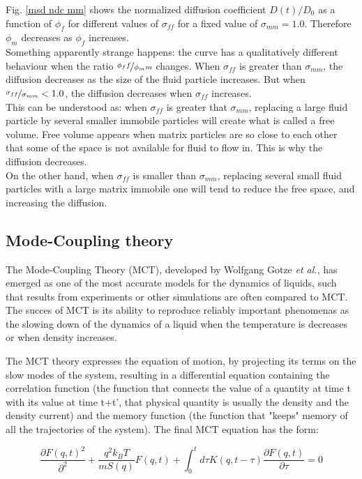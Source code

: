 \documentclass[a4paper,12pt]{article}
\newcommand{\jline}{\vspace{10pt}}
\newcommand{\etal}{\textit{et al.}}
\begin{document}
Fig. \ref{msd ndc mm} shows the normalized diffusion coefficient $D(t)/D_0$ as a function of $\phi_f$ for different values of $\sigma_{ff}$ for a fixed value of $\sigma_{mm}=1.0$. Therefore $\phi_m$ decreases as $\phi_f$ increases.\\
Something apparently strange happens: the curve has a qualitatively different behaviour when the ratio $\nicefrac{\phi_ff}{\phi_mm}$ changes. When $\sigma_{ff}$ is greater than $\sigma_{mm}$, the diffusion decreases as the size of the fluid particle increases. But when $\nicefrac{\sigma_{ff}}{\sigma_{mm}}<1.0$, the diffusion decreases when $\sigma_{ff}$ increases.\\
This can be understood as: when $\sigma_{ff}$ is greater that $\sigma_{mm}$, replacing a large fluid particle by several smaller immobile particles will create what is called a free volume. Free volume appears when matrix particles are so close to each other that some of the space is not available for fluid to flow in. This is why the diffusion decreases. \\
On the other hand, when $\sigma_{ff}$ is smaller than $\sigma_{mm}$, replacing several small fluid particles with a large matrix immobile one will tend to reduce the free space, and increasing the diffusion.

\subsection{Mode-Coupling theory}
\label{mct}

The Mode-Coupling Theory (MCT), developed by Wolfgang Gotze \etal \cite{Bengtzelius1984}, has emerged as one of the most accurate models for the dynamics of liquids, such that results from experiments or other simulations are often compared to MCT. The succes of MCT is its ability to reproduce reliably important phenomenas as the slowing down of the dynamics of a liquid when the temperature is decreases or when density increases.\jline

The MCT theory expresses the equation of motion, by projecting its terms on the slow modes of the system, resulting in a differential equation containing the correlation function (the function that connects the value of a quantity at time t with its value at time t+t', that physical quantity is usually the density and the density current) and the memory function (the function that "keeps" memory of all the trajectories of the system). The final MCT equation has the form:

\begin{equation}
\frac{\partial F(q,t)^2}{\partial^2}+\frac{q^2k_BT}{mS(q)}F(q,t)+\int_0^t d\tau K(q,t-\tau) \frac{\partial F(q,t)}{\partial \tau}=0
\end{equation}
\end{document}
